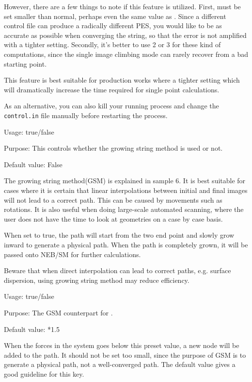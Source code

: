 However, there are a few things to note if this feature is utilized. First,  must be set smaller than normal, perhaps even the same value as . Since a different control file can produce a radically different PES, you would like to be as accurate as possible when converging the string, so that the error is not amplified with a tighter setting. Secondly, it's better to use  2 or 3 for these kind of computations, since the single image climbing mode can rarely recover from a bad starting point. 

This feature is best suitable for production works where a tighter setting which will dramatically increase the time required for single point calculations.

As an alternative, you can also kill your running process and change the \texttt{control.in} file manually before restarting the process. 


{
Usage:  true/false 


Purpose: This controls whether the growing string method is used or not. 


Default value: False
}
The growing string method(GSM) is explained in sample 6. It is best suitable for cases where it is certain that linear interpolations between initial and final images will not lead to a correct path. This can be caused by movements such as rotations. It is also useful when doing large-scale automated scanning, where the user does not have the time to look at geometries on a case by case basis.

When set to true, the path will start from the two end point and slowly grow inward to generate a physical path. When the path is completely grown, it will be passed onto NEB/SM for further calculations.

Beware that when direct interpolation can lead to correct paths, e.g. surface dispersion, using growing string method may reduce efficiency. 

{
Usage:  true/false 


Purpose: The GSM counterpart for .


Default value: *1.5
}

When the forces in the system goes below this preset value, a new node will be added to the path. It should not be set too small, since the purpose of GSM is to generate a physical path, not a well-converged path. The default value gives a good guideline for this key. 


